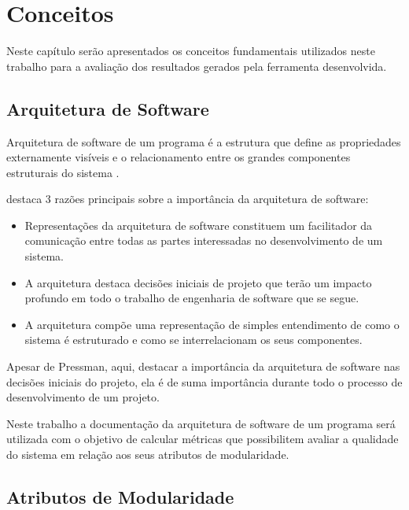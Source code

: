 \chapter{Conceitos} \label{ch:conceitos}

Neste capítulo serão apresentados os conceitos fundamentais utilizados neste
trabalho para a avaliação dos resultados gerados pela ferramenta desenvolvida.

\section{Arquitetura de Software}

Arquitetura de software de um programa é a estrutura que define as propriedades
externamente visíveis e o relacionamento entre os grandes componentes
estruturais do sistema \cite{engenhariaDeSoftwarePressman}.

 destaca 3 razões principais sobre a
importância da arquitetura de software:

\begin{itemize}

\item Representações da arquitetura de software constituem um facilitador da
comunicação entre todas as partes interessadas no desenvolvimento de um
sistema.

\item A arquitetura destaca decisões iniciais de projeto que terão um impacto
profundo em todo o trabalho de engenharia de software que se segue.

\item A arquitetura compõe uma representação de simples entendimento de como o
sistema é estruturado e como se interrelacionam os seus componentes.

\end{itemize}

Apesar de Pressman, aqui, destacar a importância da arquitetura de software nas
decisões iniciais do projeto, ela é de suma importância durante todo o processo
de desenvolvimento de um projeto.

Neste trabalho a documentação da arquitetura de software de um programa será
utilizada com o objetivo de calcular métricas que possibilitem avaliar a
qualidade do sistema em relação aos seus atributos de modularidade.

\section{Atributos de Modularidade}


